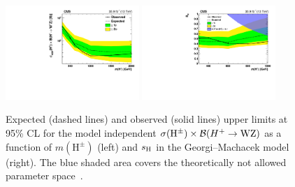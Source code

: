 \begin{figure}[htbp]
\begin{center}
  \includegraphics[width=0.45\textwidth]{figures/AnalysisResults/limits_Ind.pdf}
  \includegraphics[width=0.45\textwidth]{figures/AnalysisResults/limits_GM.pdf}
\caption{Expected (dashed lines)
  and observed (solid lines) upper limits at 95\% CL for the model independent 
  $\sigma(\mathrm{H}^{\pm}) \times \mathcal{B}(H^+\rightarrow \mathrm{W}\mathrm{Z})$ 
  as a function of $m(\mathrm{H}^\pm)$ (left) and $s_{\mathrm{H}}$ in the Georgi--Machacek model (right).
  The blue shaded area covers the theoretically not allowed parameter space~\cite{Zaro:2002500}.
}
\label{fig:higgsLimits}
\end{center}
\end{figure}

